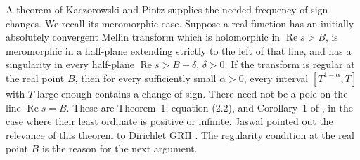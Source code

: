 \documentclass[11pt,letterpaper]{article}
\newcommand{\Rea}{\operatorname{Re}}
\numberwithin{equation}{section}
\begin{document}
A theorem of Kaczorowski and Pintz supplies the needed frequency of sign changes. We recall its meromorphic case. Suppose a real function has an initially absolutely convergent Mellin transform which is holomorphic in \(\Rea s>B\), is meromorphic in a half-plane extending strictly to the left of that line, and has a singularity in every half-plane \(\Rea s>B-\delta\), \(\delta>0\). If the transform is regular at the real point \(B\), then for every sufficiently small \(\alpha>0\), every interval \([T^{1-\alpha},T]\) with \(T\) large enough contains a change of sign. There need not be a pole on the line \(\Rea s=B\). These are Theorem~1, equation (2.2), and Corollary~1 of \cite[pp.~175--176, 179]{kp}, in the case where their least ordinate is positive or infinite. Jaswal pointed out the relevance of this theorem to Dirichlet GRH \cite[\S3.3]{jaswal}. The regularity condition at the real point \(B\) is the reason for the next argument.
\end{document}
